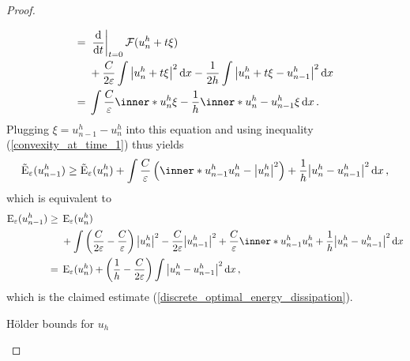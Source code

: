 \begin{proof}
\begin{description}[wide=0pt]
\begin{align*}
		={}&
		\left. \dv{ t } \right|_{ t = 0 } 
			\mathcal{ F } ( u_{ n }^{ h } + t \xi )
		\\
		{}&+ 
		\frac{ C }{ 2 \varepsilon } 
		\int 
			\abs{ u_{ n }^{ h } + t \xi }^{ 2 } 
		\dd{ x }
		-
		\frac{ 1 }{ 2h } 
		\int 
			\abs{ u_{n }^{ h } + t \xi - u_{ n - 1 }^{ h } }^{ 2 } 
		\dd{ x }
		\\
		={}& 
		\int
			\frac{ C }{ \varepsilon }
			\inner*{u_{ n }^{ h }}{\xi}
			-
			\frac{ 1 }{ h }
			\inner*{ u_{ n }^{ h } - u_{ n - 1 } ^{ h } }{ \xi }
		\dd{x}.
	\end{align*}
	Plugging $ \xi = u_{ n - 1 }^{ h } - u_{ n }^{ h } $ into this equation and using inequality (\ref{convexity_at_time_1})  thus yields
	\begin{equation*}
		\tilde{\energy}_{ \varepsilon } ( u_{ n - 1 }^{ h } ) 
		\geq
		\tilde{\energy}_{ \varepsilon} ( u_{ n }^{ h } )
		+
		\int
			\frac{ C }{ \varepsilon } 
			\left(
				\inner*{ u_{ n - 1 }^{ h } }{ u_{n }^{ h }}
				-
				\abs{ u_{ n }^{ h }}^{ 2 }
			\right)
			+
			\frac{ 1 }{ h }
			\abs{ u_{n }^{ h } - u_{ n -1 }^{ h } }^{ 2 }
		\dd{ x },
	\end{equation*}
	which is equivalent to
	\begin{align*}
		\energy_{ \varepsilon } (u_{ n - 1 }^{ h } )
		\geq {} &
		\energy_{ \varepsilon } (u_{ n }^{ h } )
		\\
		& +
		\int
			\left(
				\frac{ C }{ 2 \varepsilon }
				-
				\frac{ C }{ \varepsilon }
			\right)
			\abs{ u_{ n }^{ h } }^{ 2 }
			-
			\frac{ C }{ 2 \varepsilon }
			\abs{ u_{n - 1 }^{ h } }^{ 2 }
			+ 
			\frac{ C }{ \varepsilon }
			\inner*{ u_{ n - 1 }^{ h } }{ u_{ n }^{ h } }
			+ 
			\frac{ 1 }{ h }
			\abs{ u_{ n }^{ h } - u_{ n - 1 }^{ h } }^{ 2 }
		\dd{ x }
		\\
		= {} &
		\energy_{ \varepsilon } ( u_{n }^{ h } )
		+
		\left( 
			\frac{ 1 }{ h }
			- 
			\frac{ C }{ 2 \varepsilon }
		\right)
		\int 
			\abs{ u_{n }^{ h } - u_{ n - 1 }^{ h } }^{ 2 }
		\dd{ x },
	\end{align*}
	which is the claimed estimate (\ref{discrete_optimal_energy_dissipation}).
	
	\item[Step 4:] Hölder bounds for $ u_{ h } $
	

\end{description}
\end{proof}
